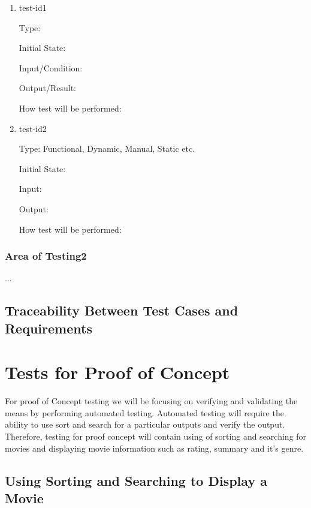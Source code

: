 \documentclass[12pt, titlepage]{article}
\begin{document}
\begin{enumerate}

\item{test-id1\\}

Type: 
					
Initial State: 
					
Input/Condition: 
					
Output/Result: 
					
How test will be performed: 
					
\item{test-id2\\}

Type: Functional, Dynamic, Manual, Static etc.
					
Initial State: 
					
Input: 
					
Output: 
					
How test will be performed: 

\end{enumerate}

\subsubsection{Area of Testing2}

...

\subsection{Traceability Between Test Cases and Requirements}

\section{Tests for Proof of Concept}

For proof of Concept testing we will be focusing on verifying and validating the means by performing automated testing. Automated testing will require the ability to use sort and search for a particular outputs and verify the output. Therefore, testing for proof concept will contain using of sorting and searching for movies and displaying movie information such as rating, summary and it’s genre. 

\subsection{Using Sorting and Searching to Display a Movie}
		
\end{document}
